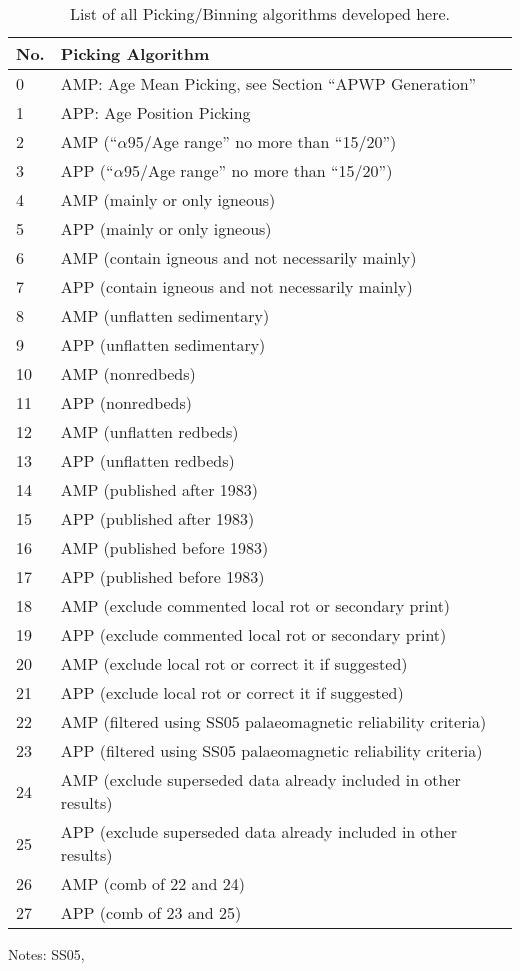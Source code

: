 \begin{table}
\centering
\caption{List of all Picking/Binning algorithms developed here.}\label{tab-pick}
\begin{tabular}{@{}ll@{}}
\toprule
No. & Picking Algorithm \\ \midrule
0 & AMP: Age Mean Picking, see Section ``APWP Generation'' \\
1 & APP: Age Position Picking \\
2 & AMP (``$\alpha$95/Age range'' no more than ``15/20'') \\
3 & APP (``$\alpha$95/Age range'' no more than ``15/20'') \\
4 & AMP (mainly or only igneous) \\
5 & APP (mainly or only igneous) \\
6 & AMP (contain igneous and not necessarily mainly) \\
7 & APP (contain igneous and not necessarily mainly) \\
8 & AMP (unflatten sedimentary) \\
9 & APP (unflatten sedimentary) \\
10 & AMP (nonredbeds) \\
11 & APP (nonredbeds) \\
12 & AMP (unflatten redbeds) \\
13 & APP (unflatten redbeds) \\
14 & AMP (published after 1983) \\
15 & APP (published after 1983) \\
16 & AMP (published before 1983) \\
17 & APP (published before 1983) \\
18 & AMP (exclude commented local rot or secondary print) \\
19 & APP (exclude commented local rot or secondary print) \\
20 & AMP (exclude local rot or correct it if suggested) \\
21 & APP (exclude local rot or correct it if suggested) \\
22 & AMP (filtered using SS05 palaeomagnetic reliability criteria) \\
23 & APP (filtered using SS05 palaeomagnetic reliability criteria) \\
24 & AMP (exclude superseded data already included in other results) \\
25 & APP (exclude superseded data already included in other results) \\
26 & AMP (comb of 22 and 24) \\
27 & APP (comb of 23 and 25) \\ \bottomrule
\end{tabular}
\raggedright{Notes: SS05,~\cite{S05}}
\end{table}

